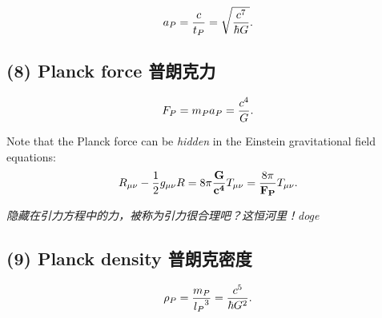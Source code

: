 \[a_P = {c \over t_P} = \sqrt{c^7 \over \hbar G}.\]

\subsection*{(8) Planck force
普朗克力}\label{planck-force-ux666eux6717ux514bux529b}

\[F_P = m_P a_P = {c^4 \over G}.\]

Note that the Planck force can be \emph{hidden} in the Einstein
gravitational field equations: \[R_{\mu\nu} - {1 \over 2}g_{\mu\nu}R = 8 \pi \mathbf{G \over c^4}T_{\mu\nu} = {8 \pi \over \mathbf{F_P}} T_{\mu\nu}.\]

\emph{隐藏在引力方程中的力，被称为引力很合理吧？这恒河里！doge}

\subsection*{(9) Planck density
普朗克密度}\label{planck-density-ux666eux6717ux514bux5bc6ux5ea6}

\[\rho_P = {m_P \over {l_P}^3} = {c^5 \over \hbar G^2}.\]
